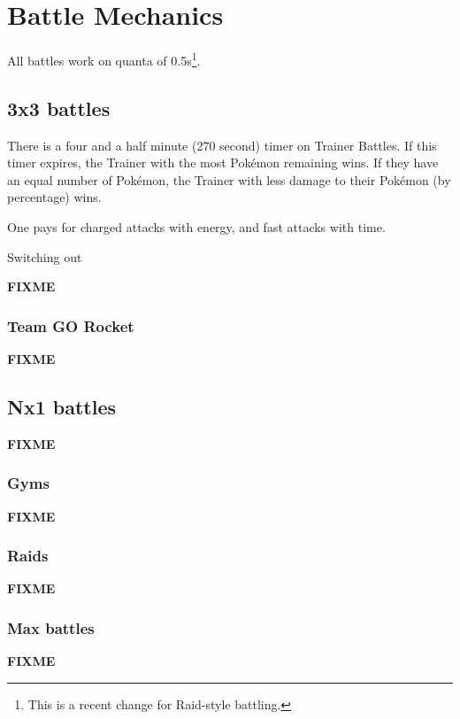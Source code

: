 \chapter{Battle Mechanics}
\label{chap:battle}
All battles work on quanta of 0.5s\footnote{This is a recent change for Raid-style battling.}.

\section{3x3 battles}
\label{sec:3x3}
There is a four and a half minute (270 second) timer on Trainer Battles.
If this timer expires, the Trainer with the most Pokémon remaining wins.
If they have an equal number of Pokémon, the Trainer with less damage to their
  Pokémon (by percentage) wins.

One pays for charged attacks with energy, and fast attacks with time.

Switching out 

\textbf{FIXME}

\subsection{Team GO Rocket}
\label{sec:rocket}
\textbf{FIXME}

\section{Nx1 battles}
\label{sec:nx1}
\textbf{FIXME}

\subsection{Gyms}
\label{sec:gyms}
\textbf{FIXME}

\subsection{Raids}
\label{sec:raids}
\textbf{FIXME}

\subsection{Max battles}
\label{sec:maxbattles}
\textbf{FIXME}
